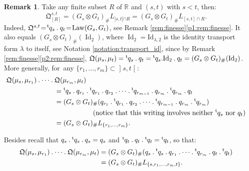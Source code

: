 \documentclass[10pt,a4paper]{article}
\newcommand{\ldot}{\mathbin{.}}
\newcommand{\lcdots}{\ldot\cdots\ldot}
\theoremstyle{plain}
\theoremstyle{definition}
\newtheorem{rem}[them]{Remark}
\newcommand{\id}{\mathrm{Id}}
\newcommand{\como}{\mathfrak{Q}}
\newcommand{\Id}{\operatorname{Id}}
\newcommand{\trans}{{}^{\mathrm{t}}\mkern-1mu}
\newcommand{\la}{\lambda}
\newcommand{\R}{\mathbb{R}}
\newcommand{\law}{\operatorname{Law}}
\newcommand{\op}{\mathopen}
\newcommand{\clo}{\mathclose}
\begin{document}
\begin{rem}\label{rem:comp_mini} Take any finite subset $R$ of $\R$ and $(s,t)$ with $s<t$, then:
\[\como^{s,t}_{[R]}=(G_s\otimes G_t)_\#L_{]s,t[\cap R}=(G_s\otimes G_t)_\#L_{[s,t]\cap R}.\]
Indeed, $\como^{s,t}\!=\!\trans q_s\ldot q_t\!=\!\law(G_s,G_t)$, see Remark \ref{rem:finesse}\eqref{p1:rem:finesse}. It also equals $(G_s\otimes G_t)_\#(\Id_2)$, where $\Id_2=\id_{\la,2}$ is the identity transport form $\la$ to itself, see Notation \ref{notation:transport_id}, since by Remark \ref{rem:finesse}\eqref{p2:rem:finesse}, $\como(\mu_s,\mu_t)=\trans q_s \ldot q_t=\trans q_s. \id_2 \ldot q_t=(G_s\otimes G_t)_\#(\Id_2)$. More generally, for~any $\{r_1,\ldots,r_m\}\subset\op]s,t\clo[$:
\begin{align*}
\como(\mu_{s},\mu_{r_1})\lcdots{}& \como(\mu_{r_m},\mu_{t})\\
&=\trans q_{s}{}\ldot q_{r_1}{}\ldot\trans q_{r_1}{}\ldot q_{r_2}\lcdots \trans q_{r_{m-1}}{}\ldot q_{r_{m}}{}\ldot\trans q_{r_{m}}{}\ldot q_{t}\\
&=(G_{s}\otimes G_{t})_\#(q_{r_1}{}\ldot\trans q_{r_1}{}\ldot q_{r_2}\lcdots \trans q_{r_{m-1}}{}\ldot q_{r_{m}}{}\ldot\trans q_{r_{m}})\\
&\hspace*{2cm}\text{(notice that this writing involves neither $\trans q_{s}$ nor $q_{t}$)}\\
&=(G_{s}\otimes G_t)_\#L_{\{r_1,\ldots,r_m\}}.
\end{align*}

Besides recall that $q_s\ldot\trans q_s\ldot q_s=q_s$ and $\trans q_t\ldot q_t\ldot\trans q_t=\trans q_t$, so that:
\begin{align*}
\como(\mu_{s},\mu_{r_1})\lcdots \como(\mu_{r_m},\mu_{t})
&=(G_{s}\otimes G_{t})_\#(q_{s}{}\ldot\trans q_{s}{}\ldot q_{r_1}\lcdots \trans q_{r_m}{}\ldot q_{t}{}\ldot\trans q_{t})\\
&=(G_{s}\otimes G_t)_\#L_{\{s,r_1,\ldots,r_m,t\}}.
\end{align*}
\end{rem}
\end{document}
